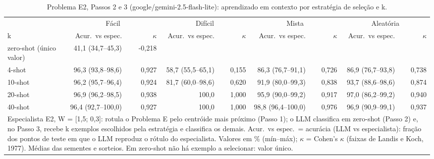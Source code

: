 \begin{table}[htbp]
\centering
\small
\caption{Problema E2, Passos 2 e 3 (google/gemini-2.5-flash-lite): aprendizado em contexto por estratégia de seleção e k.}
\label{tab:bloco2_E2_passo3_estrategia_x_k_flashlite}
\begin{tabular}{lrrrrrrrr}
\toprule
 & \multicolumn{2}{c}{Fácil} & \multicolumn{2}{c}{Difícil} & \multicolumn{2}{c}{Mista} & \multicolumn{2}{c}{Aleatória} \\ \cmidrule(lr){2-3} \cmidrule(lr){4-5} \cmidrule(lr){6-7} \cmidrule(lr){8-9}
k & Acur.\ vs espec. & $\kappa$ & Acur.\ vs espec. & $\kappa$ & Acur.\ vs espec. & $\kappa$ & Acur.\ vs espec. & $\kappa$ \\
\midrule
zero-shot (único valor) & 41,1 (34,7–45,3) & -0,218 &  &  &  &  &  &  \\
4-shot & 96,3 (93,8–98,6) & 0,927 & 58,7 (55,5–65,1) & 0,155 & 86,3 (76,7–91,1) & 0,726 & 86,9 (76,7–93,8) & 0,738 \\
10-shot & 96,2 (95,7–96,4) & 0,924 & 81,7 (60,0–98,6) & 0,620 & 91,9 (80,0–99,3) & 0,838 & 93,7 (88,6–98,6) & 0,874 \\
20-shot & 96,9 (96,2–98,5) & 0,938 & 100,0 & 1,000 & 95,9 (90,0–99,2) & 0,917 & 97,0 (86,2–99,2) & 0,940 \\
40-shot & 96,4 (92,7–100,0) & 0,927 & 100,0 & 1,000 & 98,8 (96,4–100,0) & 0,976 & 96,9 (90,9–99,1) & 0,937 \\
\bottomrule
\multicolumn{9}{p{0.95\linewidth}}{\footnotesize Especialista E2, W = [1,5; 0,3]: rotula o Problema E pelo centróide mais próximo (Passo 1); o LLM classifica em zero-shot (Passo 2) e, no Passo 3, recebe k exemplos escolhidos pela estratégia e classifica os demais. Acur.\ vs espec.\ = acurácia (LLM vs especialista): fração dos pontos de teste em que o LLM reproduz o rótulo do especialista. Valores em \% (mín–máx); $\kappa$ = Cohen's $\kappa$ (faixas de Landis e Koch, 1977). Médias das sementes e sorteios. Em zero-shot não há exemplo a selecionar: valor único.} \\
\end{tabular}
\end{table}
